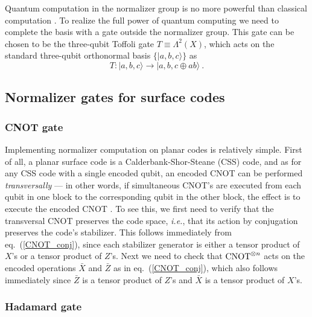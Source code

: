 Quantum computation in the normalizer group is no more powerful than classical computation \cite{gott_heisenberg}. To realize the full power of quantum computing we need to complete the basis with a gate outside the normalizer group. This gate can be chosen to be the three-qubit Toffoli gate $T\equiv \Lambda^2(X)$, which acts on the standard three-qubit orthonormal basis $\{|a,b,c\rangle\}$ as
\begin{equation}
T:|a,b,c\rangle \to |a,b,c\oplus ab\rangle~.
\end{equation}


\subsection{Normalizer gates for surface codes}

\subsubsection{CNOT gate}
Implementing normalizer computation on planar codes is relatively simple. First of all, a planar surface code is a Calderbank-Shor-Steane \cite{cal_shor,steane_css} (CSS) code, and as for any CSS code with a single encoded qubit, an encoded CNOT can be performed {\em transversally} --- in other words, if simultaneous CNOT's are executed from each qubit in one block to the corresponding qubit in the other block, the effect is to execute the encoded CNOT \cite{gott_ft}. To see this, we first need to verify that the transversal CNOT preserves the code space, {\it i.e.}, that its action by conjugation preserves the code's stabilizer. This follows immediately from eq.~(\ref{CNOT_conj}), since each stabilizer generator is either a tensor product of $X$'s or a tensor product of $Z$'s. Next we need to check that ${\rm CNOT}^{\otimes n}$ acts on the encoded operations $\bar X$ and $\bar Z$ as in eq.~(\ref{CNOT_conj}), which also follows immediately since $\bar Z$ is a tensor product of $Z$'s and $\bar X$ is a tensor product of $X$'s.

\subsubsection{Hadamard gate}

